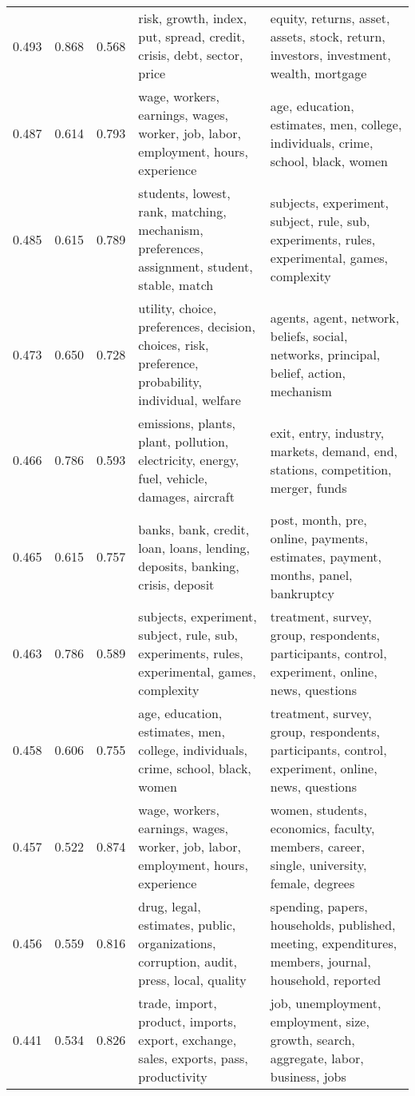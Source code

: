 \begin{tabular}{cccp{5cm}p{5cm}}
0.493 & 0.868 & 0.568 & risk, growth, index, put, spread, credit, crisis, debt, sector, price & equity, returns, asset, assets, stock, return, investors, investment, wealth, mortgage \\
0.487 & 0.614 & 0.793 & wage, workers, earnings, wages, worker, job, labor, employment, hours, experience & age, education, estimates, men, college, individuals, crime, school, black, women \\
0.485 & 0.615 & 0.789 & students, lowest, rank, matching, mechanism, preferences, assignment, student, stable, match & subjects, experiment, subject, rule, sub, experiments, rules, experimental, games, complexity \\
0.473 & 0.650 & 0.728 & utility, choice, preferences, decision, choices, risk, preference, probability, individual, welfare & agents, agent, network, beliefs, social, networks, principal, belief, action, mechanism \\
0.466 & 0.786 & 0.593 & emissions, plants, plant, pollution, electricity, energy, fuel, vehicle, damages, aircraft & exit, entry, industry, markets, demand, end, stations, competition, merger, funds \\
0.465 & 0.615 & 0.757 & banks, bank, credit, loan, loans, lending, deposits, banking, crisis, deposit & post, month, pre, online, payments, estimates, payment, months, panel, bankruptcy \\
0.463 & 0.786 & 0.589 & subjects, experiment, subject, rule, sub, experiments, rules, experimental, games, complexity & treatment, survey, group, respondents, participants, control, experiment, online, news, questions \\
0.458 & 0.606 & 0.755 & age, education, estimates, men, college, individuals, crime, school, black, women & treatment, survey, group, respondents, participants, control, experiment, online, news, questions \\
0.457 & 0.522 & 0.874 & wage, workers, earnings, wages, worker, job, labor, employment, hours, experience & women, students, economics, faculty, members, career, single, university, female, degrees \\
0.456 & 0.559 & 0.816 & drug, legal, estimates, public, organizations, corruption, audit, press, local, quality & spending, papers, households, published, meeting, expenditures, members, journal, household, reported \\
0.441 & 0.534 & 0.826 & trade, import, product, imports, export, exchange, sales, exports, pass, productivity & job, unemployment, employment, size, growth, search, aggregate, labor, business, jobs \\

\end{tabular}
